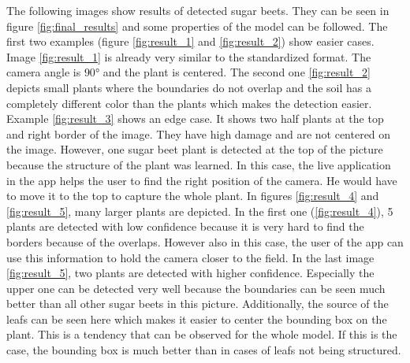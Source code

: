 The following images show results of detected sugar beets. They can be seen in figure \ref{fig:final_results} and some properties of the model can be followed. The first two examples (figure \ref{fig:result_1} and \ref{fig:result_2}) show easier cases. Image \ref{fig:result_1} is already very similar to the standardized format. The camera angle is $ 90° $ and the plant is centered. The second one \ref{fig:result_2} depicts small plants where the boundaries do not overlap and the soil has a completely different color than the plants which makes the detection easier. Example \ref{fig:result_3} shows an edge case. It shows two half plants at the top and right border of the image. They have high damage and are not centered on the image. However, one sugar beet plant is detected at the top of the picture because the structure of the plant was learned. In this case, the live application in the app helps the user to find the right position of the camera. He would have to move it to the top to capture the whole plant. In figures \ref{fig:result_4} and \ref{fig:result_5}, many larger plants are depicted. In the first one (\ref{fig:result_4}), 5 plants are detected with low confidence because it is very hard to find the borders because of the overlaps. However also in this case, the user of the app can use this information to hold the camera closer to the field. In the last image \ref{fig:result_5}, two plants are detected with higher confidence. Especially the upper one can be detected very well because the boundaries can be seen much better than all other sugar beets in this picture. Additionally, the source of the leafs can be seen here which makes it easier to center the bounding box on the plant. This is a tendency that can be observed for the whole model. If this is the case, the bounding box is much better than in cases of leafs not being structured.

